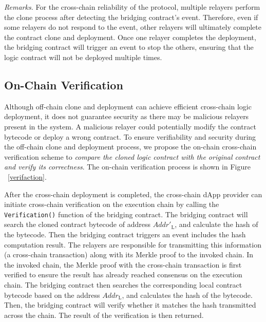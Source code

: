 \vspace{3pt}
\noindent
\emph{Remarks.}
For the cross-chain reliability of the protocol, multiple relayers perform the clone process after detecting the bridging contract's event. 
Therefore, even if some relayers do not respond to the event, other relayers will ultimately complete the contract clone and deployment.
Once one relayer completes the deployment, the bridging contract will trigger an event to stop the others, ensuring that the logic contract will not be deployed multiple times.

\subsection{On-Chain Verification}
\label{subsec:verification}

Although off-chain clone and deployment can achieve efficient cross-chain logic deployment, it does not guarantee security as there may be malicious relayers present in the system.
A malicious relayer could potentially modify the contract bytecode or deploy a wrong contract. 
To ensure verifiability and security during the off-chain clone and deployment process,
we propose the on-chain cross-chain verification scheme to \emph{compare the cloned logic contract with the original contract and verify its correctness}.
The on-chain verification process is shown in Figure ~\ref{verifaction}.

After the cross-chain deployment is completed, the cross-chain dApp provider can initiate cross-chain verification on the execution chain by calling the \texttt{Verification()} function of the bridging contract. 
The bridging contract will search the cloned contract bytecode of address $Addr'_{\text{L}}$, and calculate the hash of the bytecode. 
Then the bridging contract triggers an event includes the hash computation result. 
The relayers are responsible for transmitting this information (a cross-chain transaction) along with its Merkle proof \cite{merkle1987} to the invoked chain. 
In the invoked chain, the Merkle proof with the cross-chain transaction is first verified to ensure the result has already reached consensus on the execution chain. 
The bridging contract then searches the corresponding local contract bytecode based on the address $Addr_{\text{L}}$, and calculates the hash of the bytecode.
Then, the bridging contract will verify whether it matches the hash transmitted across the chain. 
The result of the verification is then returned.

